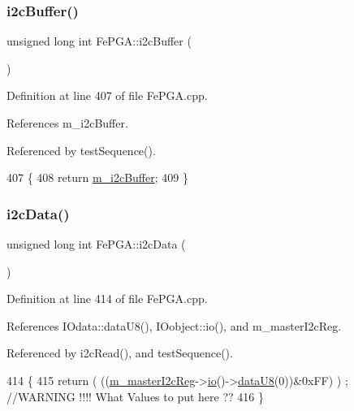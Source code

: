 \subsubsection{\texorpdfstring{i2c\+Buffer()}{i2cBuffer()}}
{\footnotesize\ttfamily unsigned long int Fe\+P\+G\+A\+::i2c\+Buffer (\begin{DoxyParamCaption}{ }\end{DoxyParamCaption})}



Definition at line 407 of file Fe\+P\+G\+A.\+cpp.



References m\+\_\+i2c\+Buffer.



Referenced by test\+Sequence().


\begin{DoxyCode}
407                                   \{
408   \textcolor{keywordflow}{return} \hyperlink{classFePGA_a173664ffd6a73f454ae31f51e689dd16}{m\_i2cBuffer};
409 \}
\end{DoxyCode}
\mbox{\label{classFePGA_a9c261a09d323c07ec4b9e925d4dfc353}} 
\subsubsection{\texorpdfstring{i2c\+Data()}{i2cData()}}
{\footnotesize\ttfamily unsigned long int Fe\+P\+G\+A\+::i2c\+Data (\begin{DoxyParamCaption}{ }\end{DoxyParamCaption})}



Definition at line 414 of file Fe\+P\+G\+A.\+cpp.



References I\+Odata\+::data\+U8(), I\+Oobject\+::io(), and m\+\_\+master\+I2c\+Reg.



Referenced by i2c\+Read(), and test\+Sequence().


\begin{DoxyCode}
414                                 \{
415   \textcolor{keywordflow}{return} ( ((\hyperlink{classFePGA_adb390ea8de4a6cbce648dc62e4405f32}{m\_masterI2cReg}->\hyperlink{classIOobject_af04fb94137c3d86849f478ac5afab5d1}{io}()->\hyperlink{classIOdata_a75e9c318dbac3a39402179070943d4bc}{dataU8}(0))&0xFF) ) ; \textcolor{comment}{//WARNING !!!! What Values to
       put here ??}
416 \}
\end{DoxyCode}
\mbox{\label{classFePGA_a210cf57766c4f818ea61af671e91cfeb}} 
